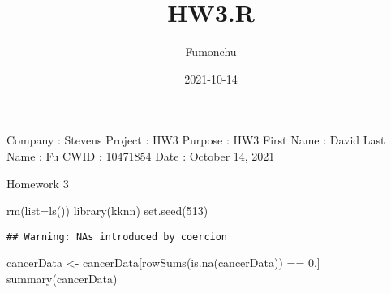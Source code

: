 \documentclass[
]{article}
\title{HW3.R}
\author{Fumonchu}
\date{2021-10-14}
\newenvironment{Shaded}{\begin{snugshade}}{\end{snugshade}}
\newcommand{\AttributeTok}[1]{\textcolor[rgb]{0.77,0.63,0.00}{#1}}
\newcommand{\ConstantTok}[1]{\textcolor[rgb]{0.00,0.00,0.00}{#1}}
\newcommand{\DecValTok}[1]{\textcolor[rgb]{0.00,0.00,0.81}{#1}}
\newcommand{\FunctionTok}[1]{\textcolor[rgb]{0.00,0.00,0.00}{#1}}
\newcommand{\NormalTok}[1]{#1}
\newcommand{\OtherTok}[1]{\textcolor[rgb]{0.56,0.35,0.01}{#1}}
\newcommand{\SpecialCharTok}[1]{\textcolor[rgb]{0.00,0.00,0.00}{#1}}
\newcommand{\StringTok}[1]{\textcolor[rgb]{0.31,0.60,0.02}{#1}}
\begin{document}
\maketitle

Company : Stevens Project : HW3 Purpose : HW3 First Name : David Last
Name : Fu CWID : 10471854 Date : October 14, 2021

Homework 3

\begin{Shaded}
\begin{Highlighting}[]
\FunctionTok{rm}\NormalTok{(}\AttributeTok{list=}\FunctionTok{ls}\NormalTok{())}
\FunctionTok{library}\NormalTok{(kknn)}
\FunctionTok{set.seed}\NormalTok{(}\DecValTok{513}\NormalTok{)}
\end{Highlighting}
\end{Shaded}

\begin{Shaded}
\end{Shaded}

\begin{verbatim}
## Warning: NAs introduced by coercion
\end{verbatim}

\begin{Shaded}
\begin{Highlighting}[]
\NormalTok{cancerData }\OtherTok{\textless{}{-}}\NormalTok{ cancerData[}\FunctionTok{rowSums}\NormalTok{(}\FunctionTok{is.na}\NormalTok{(cancerData)) }\SpecialCharTok{==} \DecValTok{0}\NormalTok{,]}
\FunctionTok{summary}\NormalTok{(cancerData)}
\end{Highlighting}
\end{Shaded}
\end{document}
